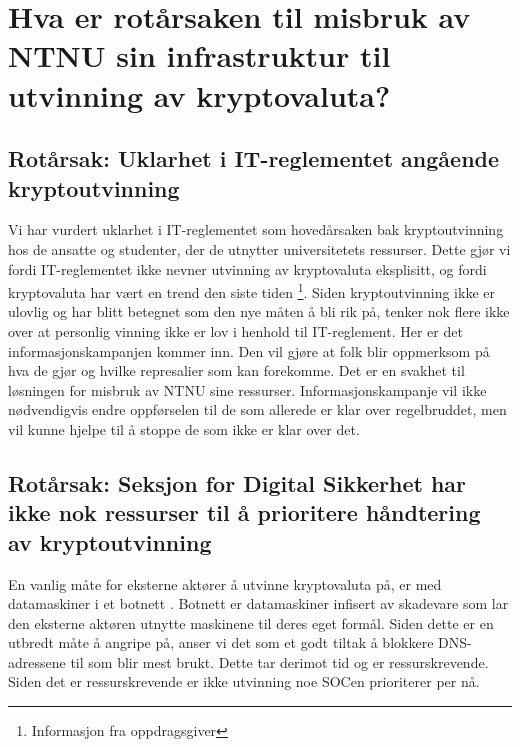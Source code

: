 \section{Hva er rotårsaken til misbruk av NTNU sin infrastruktur til utvinning av kryptovaluta?}
\subsection*{Rotårsak: Uklarhet i IT-reglementet angående kryptoutvinning}
Vi har vurdert uklarhet i IT-reglementet som hovedårsaken bak kryptoutvinning hos de ansatte og studenter, der de utnytter universitetets ressurser. Dette gjør vi fordi IT-reglementet ikke nevner utvinning av kryptovaluta eksplisitt, og fordi kryptovaluta har vært en trend den siste tiden \footnote{Informasjon fra oppdragsgiver}. Siden kryptoutvinning ikke er ulovlig og har blitt betegnet som den nye måten å bli rik på, tenker nok flere ikke over at personlig vinning ikke er lov i henhold til IT-reglement. Her er det informasjonskampanjen kommer inn. Den vil gjøre at folk blir oppmerksom på hva de gjør og hvilke represalier som kan forekomme. Det er en svakhet til løsningen for misbruk av NTNU sine ressurser. Informasjonskampanje vil ikke nødvendigvis endre oppførselen til de som allerede er klar over regelbruddet, men vil kunne hjelpe til å stoppe de som ikke er klar over det.


\subsection*{Rotårsak: Seksjon for Digital Sikkerhet har ikke nok ressurser til å prioritere håndtering av kryptoutvinning}
En vanlig måte for eksterne aktører å utvinne kryptovaluta på, er med datamaskiner i et botnett \cite{Botnet}. Botnett er datamaskiner infisert av skadevare som lar den eksterne aktøren utnytte maskinene til deres eget formål. Siden dette er en utbredt måte å angripe på, anser vi det som et godt tiltak å blokkere DNS-adressene til som blir mest brukt. Dette tar derimot tid og er ressurskrevende. Siden det er ressurskrevende er ikke utvinning noe SOCen prioriterer per nå.



